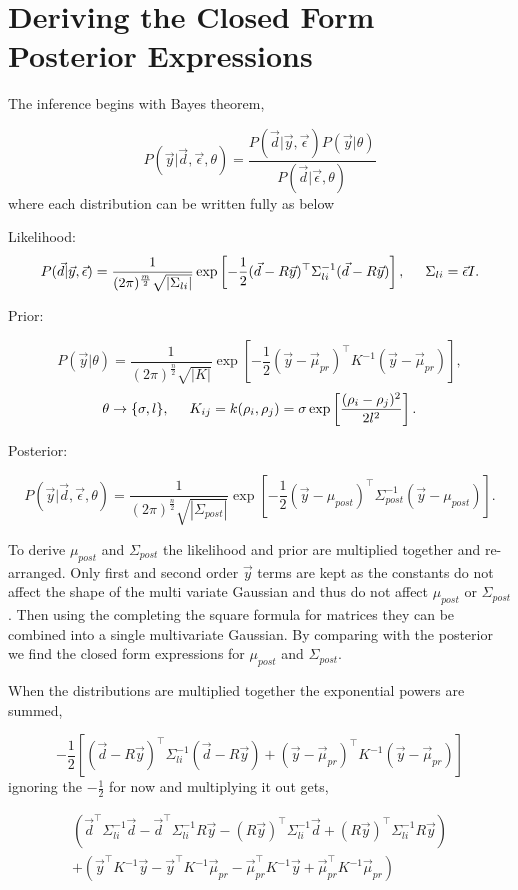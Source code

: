 \chapter{Deriving the Closed Form Posterior Expressions}
\label{append:dervcf}
The inference begins with Bayes theorem,  

$$
	P(\vec{y}|\vec{d}, \vec\epsilon, \theta) = \frac{P(\vec{d}|\vec{y},\vec\epsilon)P(\vec{y}|\theta)}{P(\vec d|\vec\epsilon,\theta)}
$$
where each distribution can be written fully as below

Likelihood:
$$
P(\vec{d}|\vec{y},\vec\epsilon) = \frac{1}{(2\pi)^{\frac{m}{2}} \sqrt{|\Sigma_{li}|}} \exp \left[ -\frac{1}{2} (\vec d - R\vec y)^{\top} \Sigma^{-1}_{li} (\vec d - R\vec y) \right], \hspace{0.5cm} \Sigma_{li} = \vec \epsilon I.
$$

Prior:

$$
P(\vec y|\theta) = \frac{1}{(2\pi)^{\frac{n}{2}} \sqrt{|K|}} \exp \left[ -\frac{1}{2}(\vec y - \vec \mu_{pr})^{\top} K^{-1} (\vec y - \vec \mu_{pr}) \right],
$$
$$
\theta \rightarrow \{\sigma, l\}, \hspace{0.5cm} K_{ij} = k(\rho_i, \rho_j) = \sigma \exp \left[\frac{(\rho_i - \rho_j)^2}{2l^2}\right].
$$

Posterior:

$$
P(\vec{y}|\vec{d},\vec\epsilon, \theta) = \frac{1}{(2\pi)^{\frac{n}{2}} \sqrt{|\Sigma_{post}|}} \exp \left[ -\frac{1}{2}(\vec y - \mu_{post})^{\top} \Sigma^{-1}_{post} (\vec y - \mu_{post}) \right].
$$

To derive $\mu_{post}$ and $\Sigma_{post}$ the likelihood and prior are multiplied together and re-arranged. Only first and second order $\vec y$ terms are kept as the constants do not affect the shape of the multi variate Gaussian and thus do not affect $\mu_{post}$ or $\Sigma_{post}$. Then using the completing the square formula for matrices they can be combined into a single multivariate Gaussian. By comparing with the posterior we find the closed form expressions for $\mu_{post}$ and $\Sigma_{post}$. 

When the distributions are multiplied together the exponential powers are summed,

$$
 -\frac{1}{2}\left[(\vec d - R\vec y)^{\top} \Sigma^{-1}_{li} (\vec d - R\vec y)  + (\vec y - \vec \mu_{pr})^{\top} K^{-1} (\vec y - \vec \mu_{pr})\right]
$$
ignoring the $-\frac{1}{2}$ for now and multiplying it out gets,

\begin{multline*}
\left(\vec d ^\top \Sigma_{li}^{-1} \vec d - \vec d^\top \Sigma_{li}^{-1} R\vec y - (R\vec y)^\top \Sigma_{li}^{-1} \vec d + (R\vec y)^\top \Sigma_{li}^{-1} R\vec y \right) \\ 
+ \left( \vec y^\top K^{-1} \vec y - \vec y^\top K^{-1} \vec \mu_{pr} - \vec \mu_{pr}^\top K^{-1} \vec y + \vec \mu_{pr}^\top K^{-1} \vec \mu_{pr} \right) \\
\end{multline*}

